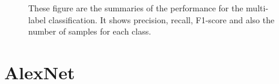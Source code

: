 \begin{figure}
\caption [Performance summary of the Components class trained on ResNet-18]{These figure are the summaries of the performance for the multi-label classification. It shows precision, recall, F1-score and also the number of samples for each class.}
\label{fig:perf_res}
\end{figure}



\section{AlexNet}\label{sec:aleX}
